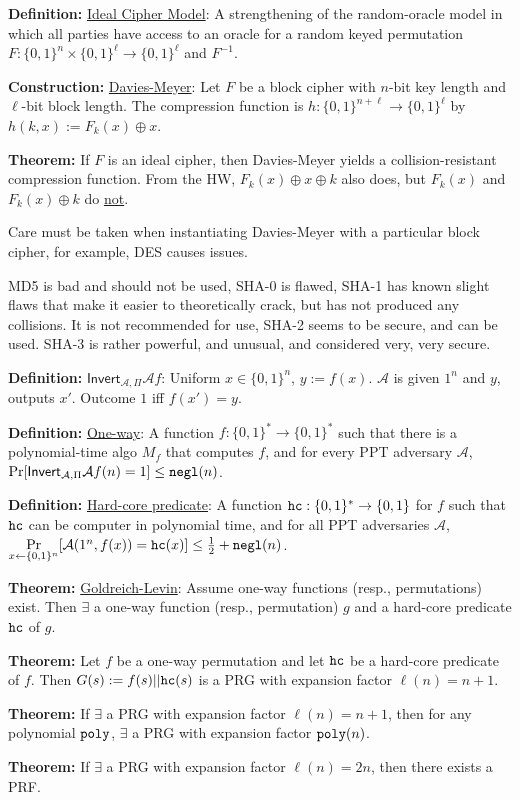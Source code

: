 \documentclass[10pt]{article}
\newcommand{\AAA}{\mathcal{A}}
\newcommand{\defn}[1]{{\bf Definition:} \underline{#1}}
\newcommand{\thm}[1]{{\bf Theorem:} \underline{#1}}
\newcommand{\con}[1]{{\bf Construction:} \underline{#1}}
\newcommand{\ExptInvtArgs}{\mathsf{Invert}_{\AAA,\Pi}}
\newcommand{\ExptInvt}{\ExptInvtArgs{\AAA}{f}}
\newcommand{\xor}{\oplus}
\newcommand{\negl}{{\tt negl}}
\newcommand{\poly}{{\tt poly}}
\newcommand{\hc}{{\tt hc}}
\newcommand{\from}{\leftarrow}
\begin{document}
\begin{multicols}{3}
\defn{Ideal Cipher Model}: A strengthening of the random-oracle model in which all parties have access to an oracle for a random keyed permutation $F:\{0,1\}^n\times\{0,1\}^\ell\to\{0,1\}^\ell$ and $F^{-1}$.

\con{Davies-Meyer}: Let $F$ be a block cipher with $n$-bit key length and $\ell$-bit block length. The compression function is $h:\{0,1\}^{n+\ell}\to\{0,1\}^\ell$ by $h(k,x):=F_k(x)\xor x$.

\thm{}If $F$ is an ideal cipher, then Davies-Meyer yields a collision-resistant compression function. From the HW, $F_k(x)\xor x\xor k$ also does, but $F_k(x)$ and $F_k(x)\xor k$ do \underline{not}.

Care must be taken when instantiating Davies-Meyer with a particular block cipher, for example, DES causes issues.

MD5 is bad and should not be used, SHA-0 is flawed, SHA-1 has known slight flaws that make it easier to theoretically crack, but has not produced any collisions. It is not recommended for use, SHA-2 seems to be secure, and can be used. SHA-3 is rather powerful, and unusual, and considered very, very secure.

\defn{$\ExptInvt$}: Uniform $x\in\{0,1\}^n$, $y:=f(x)$. $\AAA$ is given $1^n$ and $y$, outputs $x'$. Outcome $1$ iff $f(x')=y$.

\defn{One-way}: A function $f:\{0,1\}^*\to\{0,1\}^*$ such that there is a polynomial-time algo $M_f$ that computes $f$, and for every PPT adversary $\AAA$, $\Pr[\ExptInvt(n)=1]\leq\negl(n)$.

\defn{Hard-core predicate}: A function $\hc:\{0,1\}^*\to\{0,1\}$ for $f$ such that $\hc$ can be computer in polynomial time, and for all PPT adversaries $\AAA$, $\Pr\limits_{x\from\{0,1\}^n}[\AAA(1^n,f(x))=\hc(x)]\leq\frac{1}{2}+\negl(n)$.

\thm{Goldreich-Levin}: Assume one-way functions (resp., permutations) exist. Then $\exists$ a one-way function (resp., permutation) $g$ and a hard-core predicate $\hc$ of $g$.

\thm{}Let $f$ be a one-way permutation and let $\hc$ be a hard-core predicate of $f$. Then $G(s):=f(s)||\hc(s)$ is a PRG with expansion factor $\ell(n)=n+1$.

\thm{}If $\exists$ a PRG with expansion factor $\ell(n)=n+1$, then for any polynomial $\poly$, $\exists$ a PRG with expansion factor $\poly(n)$.

\thm{}If $\exists$ a PRG with expansion factor $\ell(n)=2n$, then there exists a PRF.


\end{multicols}
\end{document}
